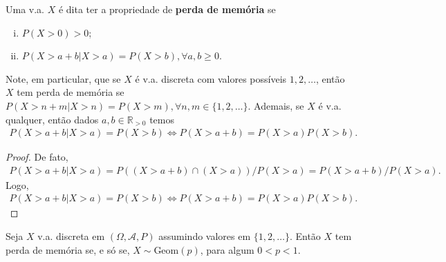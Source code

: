 \documentclass[../Notas.tex]{subfiles}
\begin{document}
\begin{definition}
Uma v.a. $X$ é dita ter a propriedade de \textbf{perda de memória} se
\begin{enumerate}[(i)]
    \item $P(X>0)>0$;
    \item $P(X > a+b | X > a) = P(X>b), \forall a, b\geq 0$.
\end{enumerate}
\end{definition}

\begin{remark}
Note, em particular, que se $X$ é v.a. discreta com valores possíveis $1, 2, \dots$, então $X$ tem perda de memória se $P(X > n+m| X > n) = P(X>m), \forall n,m\in\{1, 2, \dots\}$. Ademais, se $X$ é v.a. qualquer, então dados $a,b\in\mathbb{R}_{>0}$ temos
\begin{align*}
    P(X > a+b | X > a) = P(X>b) \iff P(X>a+b) = P(X>a)P(X>b).
\end{align*}
\begin{proof}
De fato, 
\begin{align*}
    P(X > a+b| X>a) = P((X>a+b)\cap(X>a))/P(X>a) = P(X>a+b)/P(X>a).
\end{align*}
Logo,
\begin{align*}
    P(X > a+b | X>a) = P(X>b) \iff P(X>a+b) = P(X>a)P(X>b).
\end{align*}
\end{proof}
\end{remark}

\begin{proposition}
Seja $X$ v.a. discreta em $(\Omega, \mathcal{A}, P)$ assumindo valores em $\{1, 2, \dots\}$. Então $X$ tem perda de memória se, e só se, $X\sim\text{Geom}(p)$, para algum $0 < p < 1$.
\end{proposition}
\end{document}
